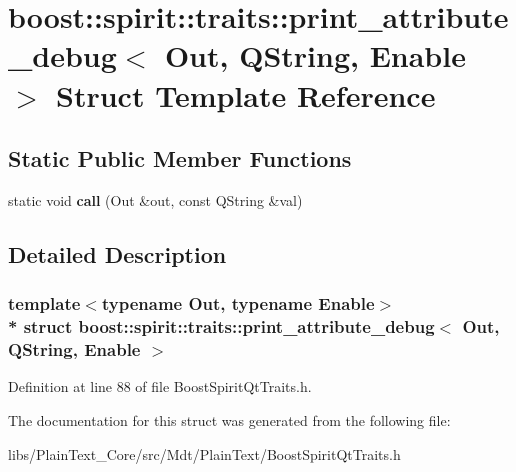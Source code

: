 \hypertarget{structboost_1_1spirit_1_1traits_1_1print__attribute__debug_3_01_out_00_01_q_string_00_01_enable_01_4}{}\section{boost\+:\+:spirit\+:\+:traits\+:\+:print\+\_\+attribute\+\_\+debug$<$ Out, Q\+String, Enable $>$ Struct Template Reference}
\label{structboost_1_1spirit_1_1traits_1_1print__attribute__debug_3_01_out_00_01_q_string_00_01_enable_01_4}
\subsection*{Static Public Member Functions}
\begin{DoxyCompactItemize}
\item 
static void {\bfseries call} (Out \&out, const Q\+String \&val)\hypertarget{structboost_1_1spirit_1_1traits_1_1print__attribute__debug_3_01_out_00_01_q_string_00_01_enable_01_4_a03dcf7d877ab3664cb9dd74712e73b92}{}\label{structboost_1_1spirit_1_1traits_1_1print__attribute__debug_3_01_out_00_01_q_string_00_01_enable_01_4_a03dcf7d877ab3664cb9dd74712e73b92}

\end{DoxyCompactItemize}


\subsection{Detailed Description}
\subsubsection*{template$<$typename Out, typename Enable$>$\\*
struct boost\+::spirit\+::traits\+::print\+\_\+attribute\+\_\+debug$<$ Out, Q\+String, Enable $>$}



Definition at line 88 of file Boost\+Spirit\+Qt\+Traits.\+h.



The documentation for this struct was generated from the following file\+:\begin{DoxyCompactItemize}
\item 
libs/\+Plain\+Text\+\_\+\+Core/src/\+Mdt/\+Plain\+Text/Boost\+Spirit\+Qt\+Traits.\+h\end{DoxyCompactItemize}
